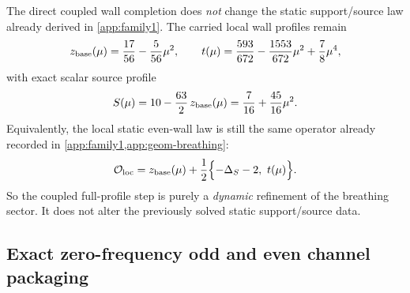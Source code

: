 \documentclass[11pt]{article}
\begin{document}
The direct coupled wall completion does \emph{not} change the static support/source law
already derived in \cref{app:family1}.
The carried local wall profiles remain
\begin{equation}
 z_{\rm base}(\mu)=\frac{17}{56}-\frac{5}{56}\mu^2,
 \qquad
 t(\mu)=\frac{593}{672}-\frac{1553}{672}\mu^2+\frac78\mu^4,
 \label{eq:family1-final-zbase-t}
\end{equation}
with exact scalar source profile
\begin{equation}
S(\mu)=10-\frac{63}{2}\,z_{\rm base}(\mu)
=\frac{7}{16}+\frac{45}{16}\mu^2.
\label{eq:family1-final-source-profile}
\end{equation}
Equivalently, the local static even-wall law is still the same operator already recorded
in \cref{app:family1,app:geom-breathing}:
\begin{equation}
\mathcal O_{\rm loc}
=
 z_{\rm base}(\mu)
+\frac12\Bigl\{-\Delta_S-2,\ t(\mu)\Bigr\}.
\label{eq:family1-final-Oloc}
\end{equation}
So the coupled full-profile step is purely a \emph{dynamic} refinement of the breathing
sector.
It does not alter the previously solved static support/source data.

\subsection{Exact zero-frequency odd and even channel packaging}
\label{app:family1-final-zero-freq}
\end{document}
